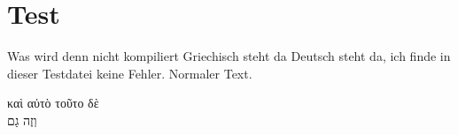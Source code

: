 \documentclass[fontsize=14pt]{mybib}
\begin{document}
\section{Test}
Was wird denn nicht kompiliert Griechisch steht da Deutsch steht da, ich finde in dieser Testdatei keine Fehler.
Normaler Text.

\textgreek{καὶ αὐτὸ τοῦτο δὲ}\\
\texthebrew{וְזֶה גַם}
\end{document}
